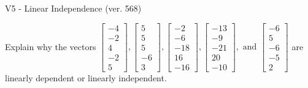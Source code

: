 \begin{exercise}
  \begin{exerciseTitle}V5 - Linear Independence (ver. 568)\end{exerciseTitle}
  \begin{exerciseStatement}
    Explain why the vectors \(\left[\begin{array}{r}
-4 \\
-2 \\
4 \\
-2 \\
5
\end{array}\right] , \left[\begin{array}{r}
5 \\
5 \\
5 \\
-6 \\
3
\end{array}\right] , \left[\begin{array}{r}
-2 \\
-6 \\
-18 \\
16 \\
-16
\end{array}\right] , \left[\begin{array}{r}
-13 \\
-9 \\
-21 \\
20 \\
-10
\end{array}\right] , \text{ and } \left[\begin{array}{r}
-6 \\
5 \\
-6 \\
-5 \\
2
\end{array}\right]\) are linearly dependent or linearly independent.	



\end{exerciseStatement}
\end{exercise}
